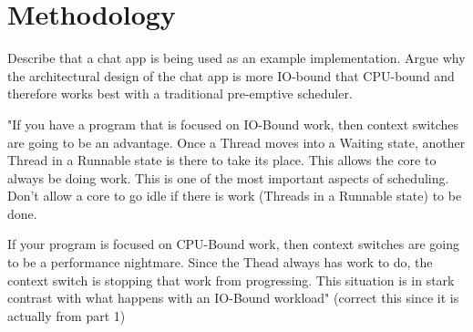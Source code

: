 \section{Methodology}
Describe that a chat app is being used as an example implementation. Argue why the architectural design of the chat app is more IO-bound that CPU-bound \cite{Kennedy2018} and therefore works best with a traditional pre-emptive scheduler.

"If you have a program that is focused on IO-Bound work, then context switches are going to be an advantage. Once a Thread moves into a Waiting state, another Thread in a Runnable state is there to take its place. This allows the core to always be doing work. This is one of the most important aspects of scheduling. Don’t allow a core to go idle if there is work (Threads in a Runnable state) to be done.

If your program is focused on CPU-Bound work, then context switches are going to be a performance nightmare. Since the Thead always has work to do, the context switch is stopping that work from progressing. This situation is in stark contrast with what happens with an IO-Bound workload"\cite{Kennedy2018} (correct this since it is actually from part 1)